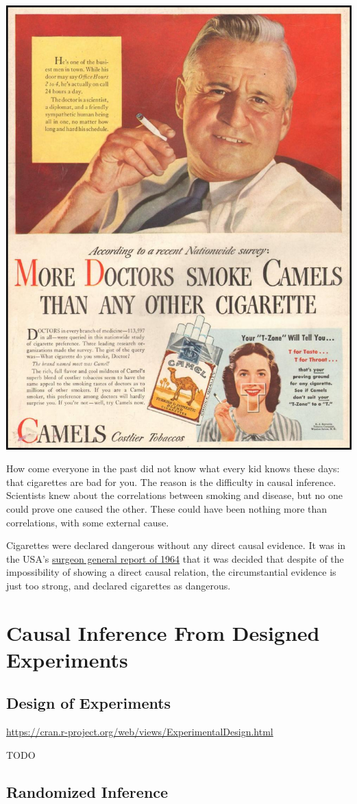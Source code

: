\documentclass[]{book}
\theoremstyle{definition}
\theoremstyle{definition}
\theoremstyle{definition}
\theoremstyle{remark}
\begin{document}
\includegraphics[width=0.5\linewidth]{art/wor}

How come everyone in the past did not know what every kid knows these
days: that cigarettes are bad for you. The reason is the difficulty in
causal inference. Scientists knew about the correlations between smoking
and disease, but no one could prove one caused the other. These could
have been nothing more than correlations, with some external cause.

Cigarettes were declared dangerous without any direct causal evidence.
It was in the USA's
\href{https://profiles.nlm.nih.gov/ps/retrieve/Narrative/NN/p-nid/60}{surgeon
general report of 1964} that it was decided that despite of the
impossibility of showing a direct causal relation, the circumstantial
evidence is just too strong, and declared cigarettes as dangerous.

\section{Causal Inference From Designed
Experiments}\label{causal-inference-from-designed-experiments}

\subsection{Design of Experiments}\label{design-of-experiments}

\url{https://cran.r-project.org/web/views/ExperimentalDesign.html}

TODO

\subsection{Randomized Inference}\label{randomized-inference}
\end{document}
